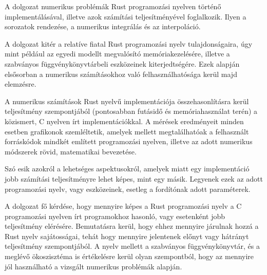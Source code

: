 
A dolgozat numerikus problémák Rust programozási nyelven történő implementálásával, illetve azok számítási teljesítményével foglalkozik. Ilyen a sorozatok rendezése, a numerikus integrálás és az interpoláció.

A dolgozat kitér a relatíve fiatal Rust programozási nyelv tulajdonságaira, úgy mint például az egyedi modellt megvalósító memóriakezelésére, illetve a szabványos függvénykönyvtárbeli eszközeinek kiterjedtségére. Ezek alapján elsősorban a numerikus számításokhoz való felhasználhatósága kerül majd elemzésre.

A numerikus számítások Rust nyelvű implementációja összehasonlításra kerül teljesítmény szempontjából (pontosabban futásidő és memóriahasználat terén) a közismert, C nyelven írt implementációkkal. A mérések eredményeit minden esetben grafikonok szemléltetik, amelyek mellett megtalálhatóak a felhasznált forráskódok mindkét említett programozási nyelven, illetve az adott numerikus módszerek rövid, matematikai bevezetése.

Szó esik azokról a lehetséges aspektusokról, amelyek miatt egy implementáció jobb számítási teljesítményre lehet képes, mint egy másik. Legyenek ezek az adott programozási nyelv, vagy eszközeinek, esetleg a fordítónak adott paraméterek.

A dolgozat fő kérdése, hogy mennyire képes a Rust programozási nyelv a C programozási nyelven írt programokhoz hasonló, vagy esetenként jobb teljesítmény elérésére. Bemutatásra kerül, hogy ehhez mennyire járulnak hozzá a Rust nyelv sajátosságai, tehát hogy mennyire jelentenek előnyt vagy hátrányt teljesítmény szempontjából. A nyelv mellett a szabványos függvénykönyvtár, és a meglévő ökoszisztéma is értékelésre kerül olyan szempontból, hogy az mennyire jól használható a vizsgált numerikus problémák alapján.
